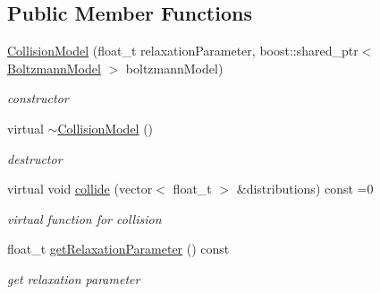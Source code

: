 \subsection*{\-Public \-Member \-Functions}
\begin{DoxyCompactItemize}
\item 
\hyperlink{classnatrium_1_1CollisionModel_aa44e7a2a1549818868887fa722df3dad}{\-Collision\-Model} (float\-\_\-t relaxation\-Parameter, boost\-::shared\-\_\-ptr$<$ \hyperlink{classnatrium_1_1BoltzmannModel}{\-Boltzmann\-Model} $>$ boltzmann\-Model)
\begin{DoxyCompactList}\small\item\em constructor \end{DoxyCompactList}\item 
\hypertarget{classnatrium_1_1CollisionModel_a2b1fb83814227db3b99d4d68a6657d52}{virtual \hyperlink{classnatrium_1_1CollisionModel_a2b1fb83814227db3b99d4d68a6657d52}{$\sim$\-Collision\-Model} ()}\label{classnatrium_1_1CollisionModel_a2b1fb83814227db3b99d4d68a6657d52}

\begin{DoxyCompactList}\small\item\em destructor \end{DoxyCompactList}\item 
virtual void \hyperlink{classnatrium_1_1CollisionModel_aa4f3dd379940af2d80509dd6f5e23c62}{collide} (vector$<$ float\-\_\-t $>$ \&distributions) const =0
\begin{DoxyCompactList}\small\item\em virtual function for collision \end{DoxyCompactList}\item 
\hypertarget{classnatrium_1_1CollisionModel_a5cc2769b78912deab3705fee63514c2a}{float\-\_\-t \hyperlink{classnatrium_1_1CollisionModel_a5cc2769b78912deab3705fee63514c2a}{get\-Relaxation\-Parameter} () const }\label{classnatrium_1_1CollisionModel_a5cc2769b78912deab3705fee63514c2a}

\begin{DoxyCompactList}\small\item\em get relaxation parameter \end{DoxyCompactList}\end{DoxyCompactItemize}
